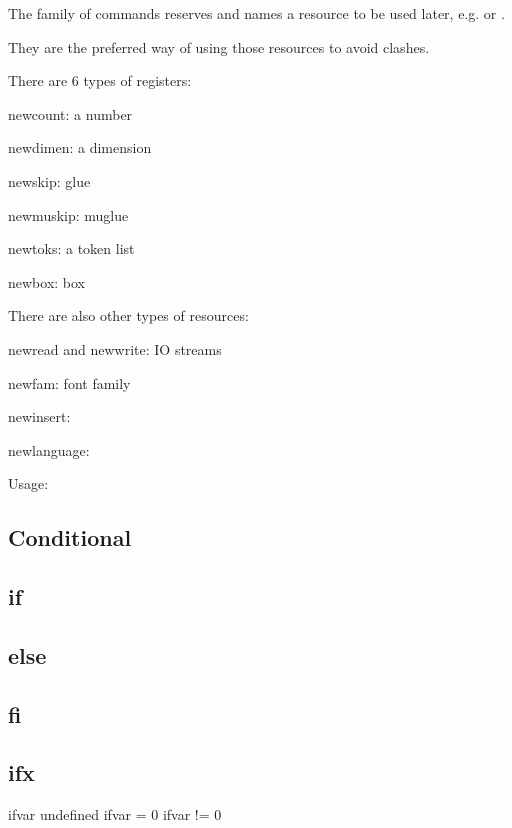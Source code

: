     The  family of commands reserves and names a resource to be used later, e.g.  or .

    They are the preferred way of using those resources to avoid clashes.

    There are 6 types of registers:

    \item{} newcount:  a number
    \item{} newdimen:  a dimension
    \item{} newskip:   glue
    \item{} newmuskip: muglue
    \item{} newtoks:   a token list
    \item{} newbox:    box

    There are also other types of resources:

    \item{} newread and newwrite: IO streams
    \item{} newfam:               font family
    \item{} newinsert:
    \item{} newlanguage:

    Usage:

    \newcount\x
    \number\x

  \subsection{Conditional}

  \subsection{if}

  \subsection{else}

  \subsection{fi}

  \subsection{ifx}

    \ifx\ifvar\undefined
      ifvar undefined
    \else
      \if{}
        ifvar = 0
      \else
        ifvar != 0
      \fi
    \fi

